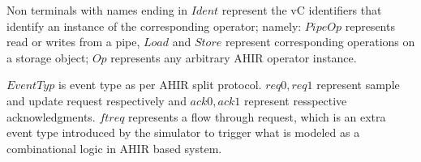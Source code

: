 \documentclass[12pt,a4paper]{article}
\begin{document}
Non terminals with names ending in $Ident$ represent the vC identifiers that identify an instance of the corresponding operator; namely: $PipeOp$ represents read or writes from a pipe, $Load$ and $Store$ represent corresponding operations on a storage object; $Op$ represents any arbitrary AHIR operator instance.

$EventTyp$ is event type as per AHIR split protocol. $req0, req1$ represent sample and update request respectively and $ack0, ack1$ represent resspective acknowledgments. $ftreq$ represents a flow through request, which is an extra event type introduced by the simulator to trigger what is modeled as a combinational logic in AHIR based system.
\end{document}
